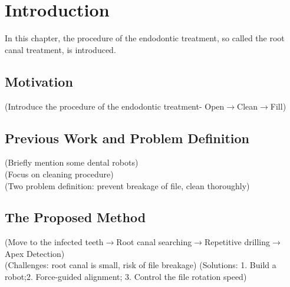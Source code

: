 \chapter{Introduction}
In this chapter, the procedure of the endodontic treatment, so called the root canal treatment, is introduced.
\section{Motivation}
(Introduce the procedure of the endodontic treatment- Open$\longrightarrow $Clean$\longrightarrow $Fill)
\section{Previous Work and Problem Definition}
(Briefly mention some dental robots)																\\
(Focus on cleaning procedure)																		\\
(Two problem definition: prevent breakage of file, clean thoroughly)								
\section{The Proposed Method}
(Move to the infected teeth$\longrightarrow $Root canal searching$\longrightarrow $Repetitive drilling$\longrightarrow $Apex Detection)		\\
(Challenges: root canal is small, risk of file breakage)
(Solutions: 1. Build a robot;2. Force-guided alignment; 3. Control the file rotation speed)										
